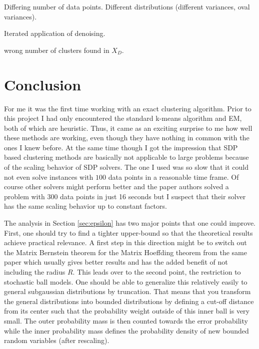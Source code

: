 \documentclass[10pt,a4paper]{article}
\begin{document}
Differing number of data points. Different distributions (different variances, oval variances).

Iterated application of denoising.

wrong number of clusters found in $X_{D}$.

\section{Conclusion}
\label{sec:conclusion}

For me it was the first time working with an exact clustering algorithm.
Prior to this project I had only encountered the standard k-means algorithm and EM, both of which are heuristic.
Thus, it came as an exciting surprise to me how well these methods are working, even though they have nothing in common with the ones I knew before.
At the same time though I got the impression that SDP based clustering methods are basically not applicable to large problems because of the scaling behavior of SDP solvers.
The one I used was so slow that it could not even solve instances with $100$ data points in a reasonable time frame.
Of course other solvers might perform better and the paper authors solved a problem with $300$ data points in just 16 seconds but I suspect that their solver has the same scaling behavior up to constant factors.

The analysis in Section \ref{sec:epsilon} has two major points that one could improve.
First, one should try to find a tighter upper-bound so that the theoretical results achieve practical relevance.
A first step in this direction might be to switch out the Matrix Bernstein theorem for the Matrix Hoeffding theorem from the same paper \cite{tailbounds} which usually gives better results and has the added benefit of not including the radius $R$.
This leads over to the second point, the restriction to stochastic ball models.
One should be able to generalize this relatively easily to general subgaussian distributions by truncation.
That means that you transform the general distributions into bounded distributions by defining a cut-off distance from its center such that the probability weight outside of this inner ball is very small.
The outer probability mass is then counted towards the error probability while the inner probability mass defines the probability density of new bounded random variables (after rescaling).

{}

\end{document}
